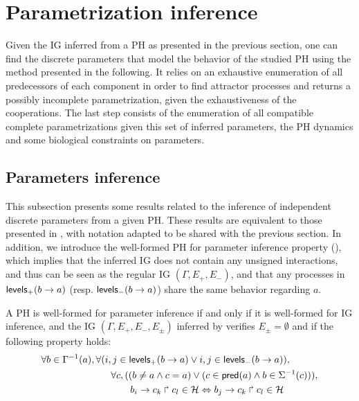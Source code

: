 \section{Parametrization inference}\label{sec:infer-K}

Given the IG inferred from a PH as presented in the previous section, one can find the discrete parameters that model the behavior of the studied PH using the method presented in the following.
It relies on an exhaustive enumeration of all predecessors of each component in order to find attractor processes and returns a possibly incomplete parametrization, given the exhaustiveness of the cooperations.
The last step consists of the enumeration of all compatible complete parametrizations given this
set of inferred parameters, the PH dynamics and some biological constraints on parameters.

\subsection{Parameters inference}

This subsection presents some results related to the inference of independent discrete parameters from a given PH. These results are equivalent to those presented in \cite{PMR10-TCSB}, with notation adapted to be shared with the previous section.
In addition, we introduce the well-formed PH for parameter inference property (),
which implies that the inferred IG does not contain any unsigned interactions, and thus can be seen as the
regular IG $(\Gamma, E_+, E_-)$,
and that any processes in $\mathsf{levels}_+(b\rightarrow a)$ (resp. $\mathsf{levels}_-(b\rightarrow a)$) share the same behavior
regarding $a$.
\begin{property}\label{pro:wf-ph-K}
A PH is well-formed for parameter inference if and only if
it is well-formed for IG inference, and
the IG $(\Gamma, E_+, E_-, E_\pm)$ inferred by 
verifies $E_\pm=\emptyset$ and if the following property holds:
\begin{align}
\begin{split}
\forall b\in \Gamma^{-1}(a) &,
	\forall (i,j\in\mathsf{levels}_+(b\rightarrow a) \vee i,j\in\mathsf{levels}_-(b\rightarrow a)), \\
& \qquad	\forall c, ( (b\neq a\wedge c=a) \vee (c\in\mathsf{pred}(a) \wedge b\in\Sigma^{-1}(c))), \\
& \qquad \qquad
			b_i\rightarrow c_k\Rsh c_l\in\mathcal{H} \Leftrightarrow
				b_j\rightarrow c_k\Rsh c_l\in\mathcal{H}
\end{split}
\label{eq:wf-levels}
\end{align}
\end{property}

